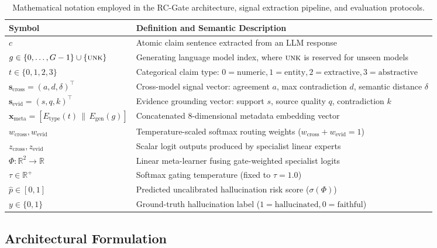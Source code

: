 \documentclass[pdflatex,sn-mathphys,Numbered]{sn-jnl}
\begin{document}
\begin{table}[htbp]
\caption{Mathematical notation employed in the RC-Gate architecture, signal extraction pipeline, and evaluation protocols.}\label{tab:notation}
\footnotesize
\setlength{\tabcolsep}{4pt}
\begin{tabular}{@{}ll@{}}
\toprule
\textbf{Symbol} & \textbf{Definition and Semantic Description} \\
\midrule
$c$ & Atomic claim sentence extracted from an LLM response \\
$g \in \{0, \dots, G-1\} \cup \{\textsc{unk}\}$ & Generating language model index, where $\textsc{unk}$ is reserved for unseen models \\
$t \in \{0, 1, 2, 3\}$ & Categorical claim type: $0=\text{numeric}, 1=\text{entity}, 2=\text{extractive}, 3=\text{abstractive}$ \\
$\mathbf{s}_{\mathrm{cross}} = (a, d, \delta)^{\top}$ & Cross-model signal vector: agreement $a$, max contradiction $d$, semantic distance $\delta$ \\
$\mathbf{s}_{\mathrm{evid}} = (s, q, k)^{\top}$ & Evidence grounding vector: support $s$, source quality $q$, contradiction $k$ \\
$\mathbf{x}_{\mathrm{meta}} = [E_{\mathrm{type}}(t) \,\|\, E_{\mathrm{gen}}(g)]$ & Concatenated 8-dimensional metadata embedding vector \\
$w_{\mathrm{cross}}, w_{\mathrm{evid}}$ & Temperature-scaled softmax routing weights ($w_{\mathrm{cross}} + w_{\mathrm{evid}} = 1$) \\
$z_{\mathrm{cross}}, z_{\mathrm{evid}}$ & Scalar logit outputs produced by specialist linear experts \\
$\Phi: \mathbb{R}^2 \to \mathbb{R}$ & Linear meta-learner fusing gate-weighted specialist logits \\
$\tau \in \mathbb{R}^+$ & Softmax gating temperature (fixed to $\tau=1.0$) \\
$\hat{p} \in [0, 1]$ & Predicted uncalibrated hallucination risk score ($\sigma(\Phi)$) \\
$y \in \{0, 1\}$ & Ground-truth hallucination label ($1=\text{hallucinated}, 0=\text{faithful}$) \\
\bottomrule
\end{tabular}
\end{table}

\subsection{Architectural Formulation}\label{subsec:arch_formulation}
\end{document}
